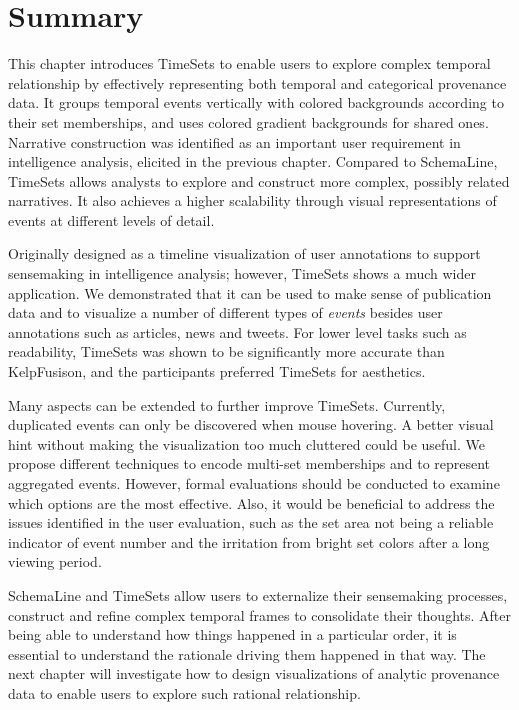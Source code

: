 \section{Summary}
This chapter introduces TimeSets to enable users to explore complex temporal relationship by effectively representing both temporal and categorical provenance data. It groups temporal events vertically with colored backgrounds according to their set memberships, and uses colored gradient backgrounds for shared ones. Narrative construction was identified as an important user requirement in intelligence analysis, elicited in the previous chapter. Compared to SchemaLine, TimeSets allows analysts to explore and construct more complex, possibly related narratives. It also achieves a higher scalability through visual representations of events at different levels of detail. 

Originally designed as a timeline visualization of user annotations to support sensemaking in intelligence analysis; however, TimeSets shows a much wider application. We demonstrated that it can be used to make sense of publication data and to visualize a number of different types of \emph{events} besides user annotations such as articles, news and tweets. For lower level tasks such as readability, TimeSets was shown to be significantly more accurate than KelpFusison, and the participants preferred TimeSets for aesthetics.

Many aspects can be extended to further improve TimeSets. Currently, duplicated events can only be discovered when mouse hovering. A better visual hint without making the visualization too much cluttered could be useful. We propose different techniques to encode multi-set memberships and to represent aggregated events. However, formal evaluations should be conducted to examine which options are the most effective. Also, it would be beneficial to address the issues identified in the user evaluation, such as the set area not being a reliable indicator of event number and the irritation from bright set colors after a long viewing period. 

SchemaLine and TimeSets allow users to externalize their sensemaking processes, construct and refine complex temporal frames to consolidate their thoughts. After being able to understand how things happened in a particular order, it is essential to understand the rationale driving them happened in that way. The next chapter will investigate how to design visualizations of analytic provenance data to enable users to explore such rational relationship.